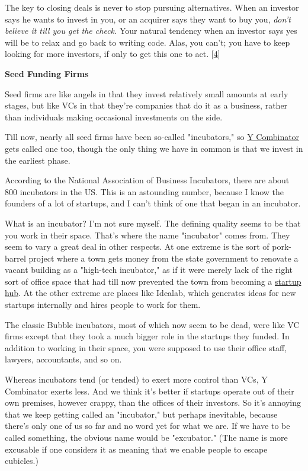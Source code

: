 The key to closing deals is never to stop pursuing alternatives.
When an investor says he wants to invest in you, or an acquirer
says they want to buy you, \emph{don't believe it till you get the
check.}  Your natural tendency when an investor says yes will
be to relax and go back to writing code.  Alas, you can't; you have
to keep looking for more investors, if only to get this one to act.
[\href{\#f4n}{4}]

\textbf{Seed Funding Firms}

Seed firms are like angels in that they invest relatively small
amounts at early stages, but like VCs in that they're companies
that do it as a business, rather than individuals making occasional
investments on the side.

Till now, nearly all seed firms have been so-called "incubators,"
so \href{http://ycombinator.com}{Y Combinator} gets called
one too, though the only thing we have in common is that we invest
in the earliest phase.

According to the National Association of Business Incubators, there
are about 800 incubators in the US.  This is an astounding number,
because I know the founders of a lot of startups, and I can't think
of one that began in an incubator.

What is an incubator?  I'm not sure myself.  The defining quality
seems to be that you work in their space.  That's where the name
"incubator" comes from.  They seem to vary a great deal in other
respects.  At one extreme is the sort of pork-barrel project where
a town gets money from the state government to renovate a vacant
building as a "high-tech incubator," as if it were merely lack of
the right sort of office space that had till now prevented the town
from becoming a 
\href{http://www.paulgraham.com/siliconvalley.html}{startup hub}.  
At the other extreme are places like
Idealab, which generates ideas for new startups internally and hires
people to work for them.

The classic Bubble incubators, most of which now seem to be dead,
were like VC firms except that they took a much bigger role in the
startups they funded.  In addition to working in their space, you
were supposed to use their office staff, lawyers, accountants, and
so on.

Whereas incubators tend (or tended) to exert more control than VCs,
Y Combinator exerts less.  
And we think it's better if startups operate out of their own
premises, however crappy, than the offices of their investors.  So
it's annoying that we keep getting called an "incubator," but perhaps
inevitable, because there's only one of us so far and no word yet
for what we are.  If we have to be called something, the obvious
name would be "excubator." (The name is more excusable if one
considers it as meaning that we enable people to escape cubicles.)


